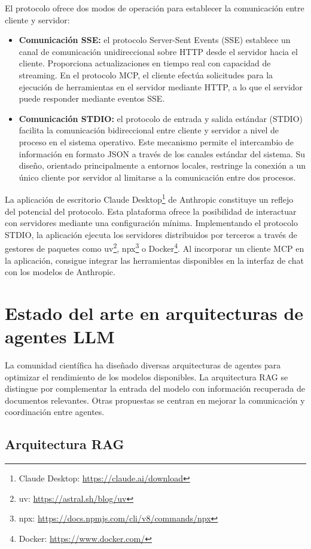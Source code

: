 El protocolo ofrece dos modos de operación para establecer la comunicación entre cliente y servidor:
\begin{itemize}
  \item{\textbf{Comunicación SSE: } el protocolo Server-Sent Events (SSE) establece un canal de comunicación unidireccional sobre HTTP desde el servidor hacia el cliente. Proporciona actualizaciones en tiempo real con capacidad de streaming. En el protocolo MCP, el cliente efectúa solicitudes para la ejecución de herramientas en el servidor mediante HTTP, a lo que el servidor puede responder mediante eventos SSE.}
\item{\textbf{Comunicación STDIO: } el protocolo de entrada y salida estándar (STDIO) facilita la comunicación bidireccional entre cliente y servidor a nivel de proceso en el sistema operativo. Este mecanismo permite el intercambio de información en formato JSON a través de los canales estándar del sistema. Su diseño, orientado principalmente a entornos locales, restringe la conexión a un único cliente por servidor al limitarse a la comunicación entre dos procesos.}
\end{itemize}
La aplicación de escritorio Claude Desktop\footnote{Claude Desktop: \url{https://claude.ai/download}} de Anthropic constituye un reflejo del potencial del protocolo. Esta plataforma ofrece la posibilidad de interactuar con servidores mediante una configuración mínima. Implementando el protocolo STDIO, la aplicación ejecuta los servidores distribuidos por terceros a través de gestores de paquetes como uv\footnote{uv: \url{https://astral.sh/blog/uv}}, npx\footnote{npx: \url{https://docs.npmjs.com/cli/v8/commands/npx}} o Docker\footnote{Docker: \url{https://www.docker.com/}}. Al incorporar un cliente MCP en la aplicación, consigue integrar las herramientas disponibles en la interfaz de chat con los modelos de Anthropic.

\section{Estado del arte en arquitecturas de agentes LLM}


La comunidad científica ha diseñado diversas arquitecturas de agentes para optimizar el rendimiento de los modelos disponibles. La arquitectura RAG se distingue por complementar la entrada del modelo con información recuperada de documentos relevantes. Otras propuestas se centran en mejorar la comunicación y coordinación entre agentes.

\subsection{Arquitectura RAG}

